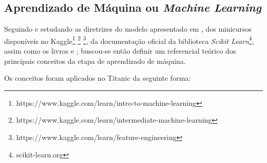 \documentclass{article}
\begin{document}
\newpage
\subsection{Aprendizado de Máquina ou \emph{Machine Learning}}
Seguindo e estudando as diretrizes do modelo apresentado em \cite{BATON}, dos minicursos disponíveis no Kaggle\footnote{https://www.kaggle.com/learn/intro-to-machine-learning} \footnote{https://www.kaggle.com/learn/intermediate-machine-learning} \footnote{https://www.kaggle.com/learn/feature-engineering}, da documentação oficial da biblioteca \emph{Scikit Learn}\cite{pedregosa2011scikit}\footnote{scikit-learn.org}, assim como os livros \cite{SCRATCH} e \cite{PRINCIPLES}; buscou-se então definir um referencial teórico dos principais conceitos da etapa de aprendizado de máquina. 

Os conceitos foram aplicados no Titanic da seguinte forma:
\end{document}
